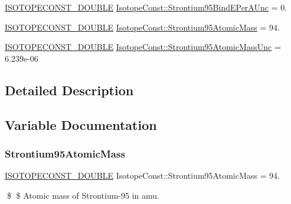 \begin{DoxyCompactItemize}
\mbox{\hyperlink{group___isotope_const-_macros_ga8f45a7272ce02c0b4c65c44636ed719a}{I\+S\+O\+T\+O\+P\+E\+C\+O\+N\+S\+T\+\_\+\+D\+O\+U\+B\+LE}} \mbox{\hyperlink{group___isotope_const-_strontium-_sr95_ga0206996ae9da0ca50af927d5b133ff0e}{Isotope\+Const\+::\+Strontium95\+Bind\+E\+Per\+A\+Unc}} = 0.
\item 
\mbox{\hyperlink{group___isotope_const-_macros_ga8f45a7272ce02c0b4c65c44636ed719a}{I\+S\+O\+T\+O\+P\+E\+C\+O\+N\+S\+T\+\_\+\+D\+O\+U\+B\+LE}} \mbox{\hyperlink{group___isotope_const-_strontium-_sr95_ga1785e11ec30055895922a70911c5b2f2}{Isotope\+Const\+::\+Strontium95\+Atomic\+Mass}} = 94.
\item 
\mbox{\hyperlink{group___isotope_const-_macros_ga8f45a7272ce02c0b4c65c44636ed719a}{I\+S\+O\+T\+O\+P\+E\+C\+O\+N\+S\+T\+\_\+\+D\+O\+U\+B\+LE}} \mbox{\hyperlink{group___isotope_const-_strontium-_sr95_ga3d6044a4c58b225b30b71ce023d72341}{Isotope\+Const\+::\+Strontium95\+Atomic\+Mass\+Unc}} = 6.\+239e-\/06
\end{DoxyCompactItemize}


\subsection{Detailed Description}


\subsection{Variable Documentation}
\mbox{\label{group___isotope_const-_strontium-_sr95_ga1785e11ec30055895922a70911c5b2f2}} 
\subsubsection{\texorpdfstring{Strontium95\+Atomic\+Mass}{Strontium95AtomicMass}}
{\footnotesize\ttfamily \mbox{\hyperlink{group___isotope_const-_macros_ga8f45a7272ce02c0b4c65c44636ed719a}{I\+S\+O\+T\+O\+P\+E\+C\+O\+N\+S\+T\+\_\+\+D\+O\+U\+B\+LE}} Isotope\+Const\+::\+Strontium95\+Atomic\+Mass = 94.}

\$ \$ Atomic mass of Strontium-\/95 in amu. \mbox{\label{group___isotope_const-_strontium-_sr95_ga3d6044a4c58b225b30b71ce023d72341}} 
